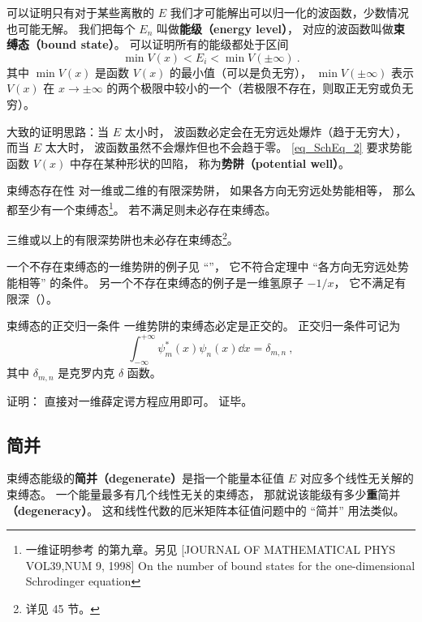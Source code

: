 可以证明只有对于某些离散的 $E$ 我们才可能解出可以归一化的波函数，少数情况也可能无解。 我们把每个 $E_n$ 叫做\textbf{能级（energy level）}， 对应的波函数叫做\textbf{束缚态（bound state）}。 可以证明所有的能级都处于区间
\begin{equation}\label{eq_SchEq_2}
\min V(x) < E_i < \min V(\pm\infty)~.
\end{equation}
其中 $\min V(x)$ 是函数 $V(x)$ 的最小值（可以是负无穷）， $\min V(\pm\infty)$ 表示 $V(x)$ 在 $x\to\pm\infty$ 的两个极限中较小的一个（若极限不存在，则取正无穷或负无穷）。

大致的证明思路：当 $E$ 太小时， 波函数必定会在无穷远处爆炸（趋于无穷大）， 而当 $E$ 太大时， 波函数虽然不会爆炸但也不会趋于零。 \autoref{eq_SchEq_2} 要求势能函数 $V(x)$ 中存在某种形状的凹陷， 称为\textbf{势阱（potential well）}。

\begin{theorem}{束缚态存在性}
对一维或二维的有限深势阱， 如果各方向无穷远处势能相等， 那么都至少有一个束缚态\footnote{一维证明参考 \cite{Teschl} 的第九章。另见 [JOURNAL OF MATHEMATICAL PHYS VOL39,NUM 9, 1998] On the number of bound states for the one-dimensional Schrodinger equation}。 若不满足则未必存在束缚态。

三维或以上的有限深势阱也未必存在束缚态\footnote{详见 \cite{Landau} 45 节。}。
\end{theorem}
一个不存在束缚态的一维势阱的例子见 “”， 它不符合定理中 “各方向无穷远处势能相等” 的条件。 另一个不存在束缚态的例子是一维氢原子 $-1/x$， 它不满足有限深（）。

\begin{theorem}{束缚态的正交归一条件}
一维势阱的束缚态必定是正交的。 正交归一条件可记为
\begin{equation}
\int_{-\infty}^{+\infty} \psi^*_m(x) \psi_n(x)\dd{x} = \delta_{m,n}~,
\end{equation}
其中 $\delta_{m,n}$ 是克罗内克 $\delta$ 函数。
\end{theorem}
证明： 直接对一维薛定谔方程应用即可。 证毕。

\subsection{简并}
束缚态能级的\textbf{简并（degenerate）}是指一个能量本征值 $E$ 对应多个线性无关解的束缚态。 一个能量最多有几个线性无关的束缚态， 那就说该能级有多少\textbf{重}简并\textbf{（degeneracy）}。 这和线性代数的厄米矩阵本征值问题中的 “简并” 用法类似。

